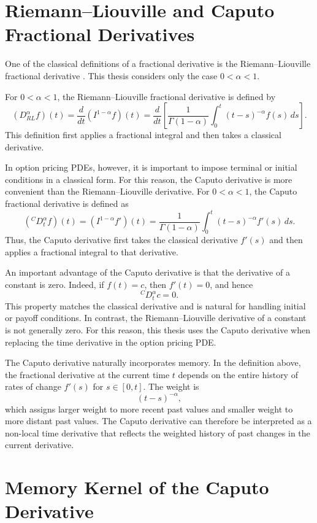 \documentclass[11pt,a4paper]{report}
\begin{document}
\section{Riemann--Liouville and Caputo Fractional Derivatives}

One of the classical definitions of a fractional derivative is the Riemann--Liouville fractional derivative \cite{Podlubny1999}. This thesis considers only the case $0<\alpha<1$.

For $0<\alpha<1$, the Riemann--Liouville fractional derivative is defined by
\[
(D_{RL}^{\alpha} f)(t)
=
\frac{d}{dt}
(I^{1-\alpha}f)(t)
=
\frac{d}{dt}
\left[
\frac{1}{\Gamma(1-\alpha)}
\int_0^t
(t-s)^{-\alpha}f(s)\,ds
\right].
\]
This definition first applies a fractional integral and then takes a classical derivative.

In option pricing PDEs, however, it is important to impose terminal or initial conditions in a classical form. For this reason, the Caputo derivative is more convenient than the Riemann--Liouville derivative. For $0<\alpha<1$, the Caputo fractional derivative is defined as \cite{Caputo1967,Podlubny1999}
\[
({}^C D_t^\alpha f)(t)
=
(I^{1-\alpha}f')(t)
=
\frac{1}{\Gamma(1-\alpha)}
\int_0^t
(t-s)^{-\alpha}f'(s)\,ds.
\]
Thus, the Caputo derivative first takes the classical derivative $f'(s)$ and then applies a fractional integral to that derivative.

An important advantage of the Caputo derivative is that the derivative of a constant is zero. Indeed, if $f(t)=c$, then $f'(t)=0$, and hence
\[
{}^C D_t^\alpha c = 0.
\]
This property matches the classical derivative and is natural for handling initial or payoff conditions. In contrast, the Riemann--Liouville derivative of a constant is not generally zero. For this reason, this thesis uses the Caputo derivative when replacing the time derivative in the option pricing PDE.

The Caputo derivative naturally incorporates memory. In the definition above, the fractional derivative at the current time $t$ depends on the entire history of rates of change $f'(s)$ for $s\in[0,t]$. The weight is
\[
(t-s)^{-\alpha},
\]
which assigns larger weight to more recent past values and smaller weight to more distant past values. The Caputo derivative can therefore be interpreted as a non-local time derivative that reflects the weighted history of past changes in the current derivative.

\section{Memory Kernel of the Caputo Derivative}
\end{document}
